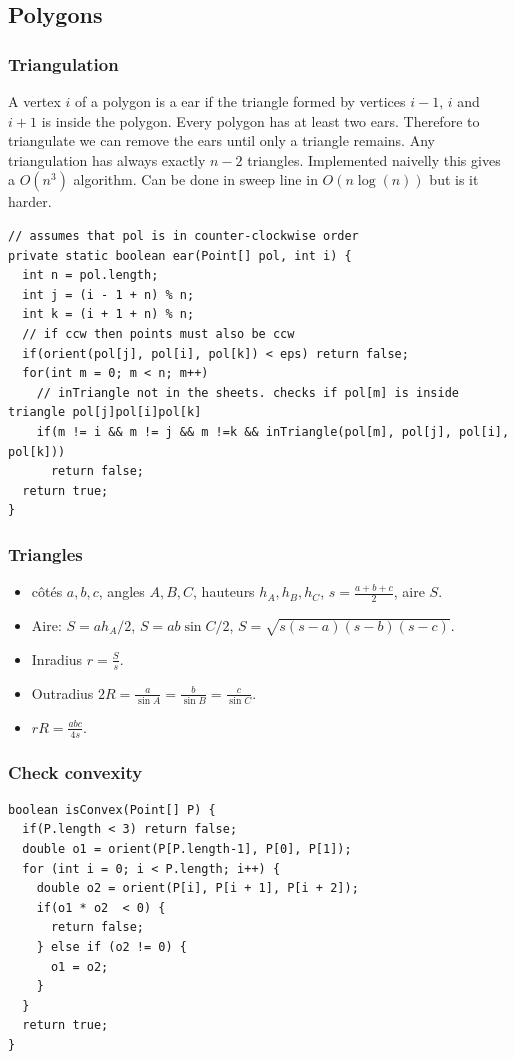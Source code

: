 \subsection{Polygons}
\subsubsection{Triangulation}
A vertex $i$ of a polygon is a ear if the triangle formed by vertices
$i - 1$, $i$ and $i + 1$ is inside the polygon. Every polygon has at
least two ears. Therefore to triangulate we can remove the ears 
until only a triangle remains. Any triangulation has always exactly 
$n - 2$ triangles. Implemented naivelly this gives a $O(n^3)$ algorithm.
Can be done in sweep line in $O(n \log(n))$ but is it harder.
\begin{lstlisting}
// assumes that pol is in counter-clockwise order
private static boolean ear(Point[] pol, int i) {
  int n = pol.length;
  int j = (i - 1 + n) % n;
  int k = (i + 1 + n) % n;
  // if ccw then points must also be ccw
  if(orient(pol[j], pol[i], pol[k]) < eps) return false;
  for(int m = 0; m < n; m++)
    // inTriangle not in the sheets. checks if pol[m] is inside triangle pol[j]pol[i]pol[k]
    if(m != i && m != j && m !=k && inTriangle(pol[m], pol[j], pol[i], pol[k]))
      return false;
  return true;
}
\end{lstlisting}

\subsubsection{Triangles}
\begin{itemize}
  \item côtés $a,b,c$, angles $A,B,C$, hauteurs $h_A,h_B,h_C$, $s=\frac{a+b+c}{2}$, aire $S$.
  \item Aire: $S=ah_A/2$, $S=ab\sin C/2$, $S=\sqrt{s(s-a)(s-b)(s-c)}$.
  \item Inradius $r=\frac{S}{s}$.
  \item Outradius $2R = \frac{a}{\sin A} = \frac{b}{\sin B} = \frac{c}{\sin C}$.
  \item $rR = \frac{abc}{4s}$.
\end{itemize}
\subsubsection{Check convexity}
\begin{lstlisting}
boolean isConvex(Point[] P) {
  if(P.length < 3) return false;
  double o1 = orient(P[P.length-1], P[0], P[1]);
  for (int i = 0; i < P.length; i++) {
    double o2 = orient(P[i], P[i + 1], P[i + 2]);
    if(o1 * o2  < 0) {
      return false;
    } else if (o2 != 0) {
      o1 = o2;
    }
  }
  return true;
}
\end{lstlisting}
